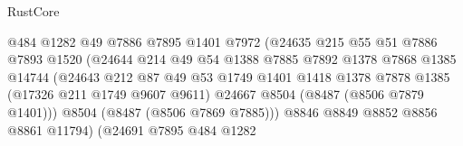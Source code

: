 \begin{lexlean}{RustCore}
\begin{coremodule}
                                        @484
                                        @1282
                                        @49
                                        @7886
                                        @7895
                                        @1401
                                        @7972
                                        (@24635
                                          @215
                                          @55
                                          @51
                                          @7886
                                          @7893
                                          @1520
                                          (@24644
                                            @214
                                            @49
                                            @54
                                            @1388
                                            @7885
                                            @7892
                                            @1378
                                            @7868
                                            @1385
                                            @14744
                                            (@24643
                                              @212
                                              @87
                                              @49
                                              @53
                                              @1749
                                              @1401
                                              @1418
                                              @1378
                                              @7878
                                              @1385
                                              (@17326 @211 @1749 @9607 @9611)
                                              @24667
                                              @8504
                                              (@8487 (@8506 @7879 @1401)))
                                            @8504
                                            (@8487 (@8506 @7869 @7885)))
                                          @8846
                                          @8849
                                          @8852
                                          @8856
                                          @8861
                                          @11794)
                                        (@24691
                                          @7895
                                          @484
                                          @1282

\end{coremodule}
\end{lexlean}
